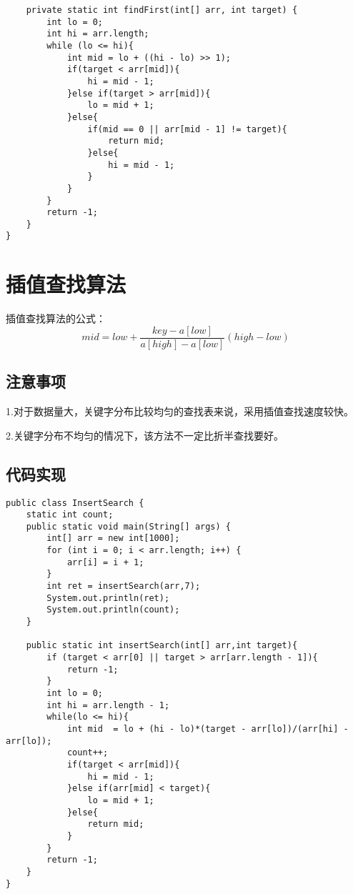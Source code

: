 \documentclass[a4paper]{report}
\begin{document}
\begin{lstlisting}
    private static int findFirst(int[] arr, int target) {
        int lo = 0;
        int hi = arr.length;
        while (lo <= hi){
            int mid = lo + ((hi - lo) >> 1);
            if(target < arr[mid]){
                hi = mid - 1;
            }else if(target > arr[mid]){
                lo = mid + 1;
            }else{
                if(mid == 0 || arr[mid - 1] != target){
                    return mid;
                }else{
                    hi = mid - 1;
                }
            }
        }
        return -1;
    }
}
\end{lstlisting}
\section{插值查找算法}
插值查找算法的公式：
\begin{equation*}
mid = low + \frac{key - a[low]}{a[high] - a[low]}(high - low)
\end{equation*}

\subsection{注意事项}
1.对于数据量大，关键字分布比较均匀的查找表来说，采用插值查找速度较快。

2.关键字分布不均匀的情况下，该方法不一定比折半查找要好。

\subsection{代码实现}
\begin{lstlisting}
public class InsertSearch {
    static int count;
    public static void main(String[] args) {
        int[] arr = new int[1000];
        for (int i = 0; i < arr.length; i++) {
            arr[i] = i + 1;
        }
        int ret = insertSearch(arr,7);
        System.out.println(ret);
        System.out.println(count);
    }

    public static int insertSearch(int[] arr,int target){
        if (target < arr[0] || target > arr[arr.length - 1]){
            return -1;
        }
        int lo = 0;
        int hi = arr.length - 1;
        while(lo <= hi){
            int mid  = lo + (hi - lo)*(target - arr[lo])/(arr[hi] - arr[lo]);
            count++;
            if(target < arr[mid]){
                hi = mid - 1;
            }else if(arr[mid] < target){
                lo = mid + 1;
            }else{
                return mid;
            }
        }
        return -1;
    }
}
\end{lstlisting}
\end{document}
